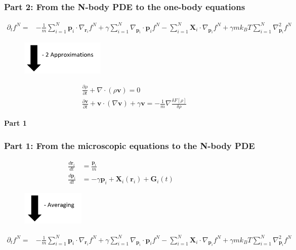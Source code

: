 \documentclass[aspectratio=169,xcolor=dvipsnames]{beamer}
\begin{document}
\begin{frame}
	\frametitle{Part 2: From the N-body PDE to the one-body equations}
	\begin{align*}
	\partial_t f^N = &- \frac{1}{m} \sum_{i=1}^N \mathbf{p}_i \cdot \nabla_{\mathbf{r}_i} f^N + \gamma \sum_{i = 1}^N \nabla_{\mathbf{p}_i}
	\cdot \mathbf{p}_i f^N - \sum_{i=1}^N \mathbf{X}_i \cdot \nabla_{\mathbf{p}_i}f^N + \gamma m k_BT \sum_{i=1}^N \nabla^2_{\mathbf{p}_i}f^N	
	\end{align*}
	\vspace{-0.2cm}
	\begin{figure}
		\includegraphics[width=4cm]{Arrow3.png}
	\end{figure}
	\vspace{-0.3cm}
	\begin{align*}
	&\frac{\partial \rho}{\partial t} + \nabla \cdot \left(\rho \mathbf{v}\right) = 0 \\
	&\frac{\partial \mathbf{v}}{\partial t} + \mathbf{v} \cdot \left(\nabla \mathbf{v}\right) + \gamma \mathbf{v} = - \frac{1}{m} \nabla \frac{\delta {F}[\rho]}{\delta \rho}
	\end{align*}
\end{frame}
\begin{frame}
	\centering
	\textbf{ \huge Part 1}
\end{frame}
\begin{frame}
	\frametitle{Part 1: From the microscopic equations to the N-body PDE}
	
	\begin{align*}
	\frac{d \mathbf{r}_i}{dt} &= \frac{\mathbf{p}_i}{m}\\
	\frac{d \mathbf{p}_i}{dt} &= - \gamma \mathbf{p}_i + \mathbf{X}_i(\mathbf{r}_i) + \mathbf{G}_i(t) \qquad \quad
	\end{align*}
	\vspace{-0.5cm}
	\begin{figure}
		\includegraphics[width=3cm]{Arrow2.png}
	\end{figure}
	\vspace{-0.3cm}
	\begin{align*}
	\partial_t f^N = &- \frac{1}{m} \sum_{i=1}^N \mathbf{p}_i \cdot \nabla_{\mathbf{r}_i} f^N + \gamma \sum_{i = 1}^N \nabla_{\mathbf{p}_i}
	\cdot \mathbf{p}_i f^N - \sum_{i=1}^N \mathbf{X}_i \cdot \nabla_{\mathbf{p}_i}f^N + \gamma m k_BT \sum_{i=1}^N \nabla^2_{\mathbf{p}_i}f^N	
	\end{align*}
	
\end{frame}
\end{document}
